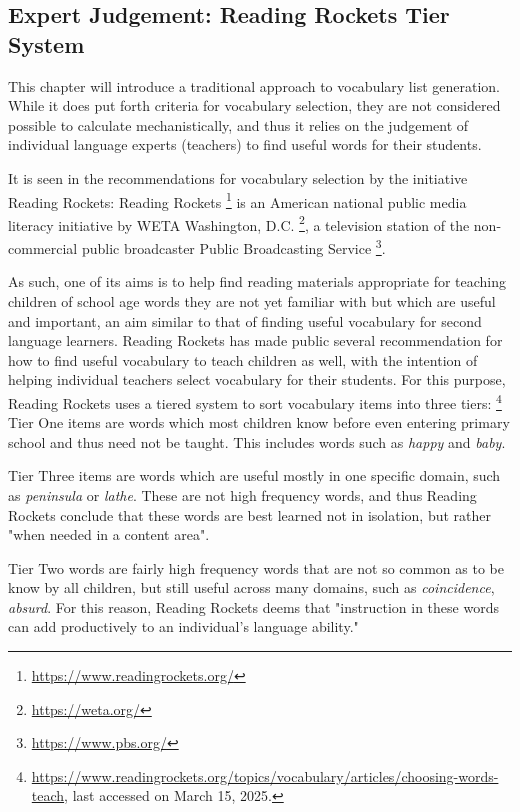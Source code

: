 \subsection{Expert Judgement: Reading Rockets Tier System}
This chapter will introduce a traditional approach to vocabulary list generation.
While it does put forth criteria for vocabulary selection, they are not considered possible to calculate mechanistically, and thus it relies on the judgement of individual language experts (teachers) to find useful words for their students.

It is seen in the recommendations for vocabulary selection by the initiative Reading Rockets:
Reading Rockets \footnote{\url{https://www.readingrockets.org/}} is an American national public media literacy initiative by WETA Washington, D.C. \footnote{\url{https://weta.org/}}, a television station of the non-commercial public broadcaster Public Broadcasting Service \footnote{\url{https://www.pbs.org/}}.

As such, one of its aims is to help find reading materials appropriate for teaching children of school age words they are not yet familiar with but which are useful and important, an aim similar to that of finding useful vocabulary for second language learners.
Reading Rockets has made public several recommendation for how to find useful vocabulary to teach children as well, with the intention of helping individual teachers select vocabulary for their students.
For this purpose, Reading Rockets uses a tiered system to sort vocabulary items into three tiers:
\footnote{\label{footnote:reading-rockets-choosing-words-to-teach} \url{https://www.readingrockets.org/topics/vocabulary/articles/choosing-words-teach}, last accessed on March 15, 2025.}
Tier One items are words which most children know before even entering primary school and thus need not be taught.
This includes words such as \textit{happy} and \textit{baby}.

Tier Three items are words which are useful mostly in one specific domain, such as \textit{peninsula} or \textit{lathe}.
These are not high frequency words, and thus Reading Rockets conclude that these words are best learned not in isolation, but rather "when needed in a content area".

Tier Two words are fairly high frequency words that are not so common as to be know by all children, but still useful across many domains, such as \textit{coincidence}, \textit{absurd}.
For this reason, Reading Rockets deems that "instruction in these words can add productively to an individual’s language ability." 


